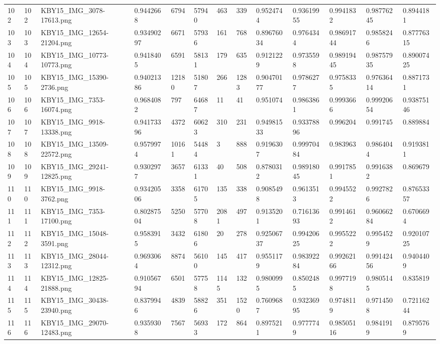 \documentclass[11pt, a4paper, twoside]{report}
\begin{document}
\begin{longtable}[c]{@{}lllllllllllll@{}}
102 & 102 & KBY15\_IMG\_3078-17613.png & 0.9442668 & 6794 & 57940 & 463 & 339 & 0.9524744 & 0.93619955 & 0.9941832 & 0.98776245 & 0.8944181 \\
103 & 103 & KBY15\_IMG\_12654-21204.png & 0.93490297 & 6671 & 57936 & 161 & 768 & 0.89676034 & 0.9764344 & 0.98691744 & 0.9858246 & 0.87776315 \\
104 & 104 & KBY15\_IMG\_10773-10773.png & 0.9418405 & 6591 & 58131 & 179 & 635 & 0.9121229 & 0.9735598 & 0.98919445 & 0.98757935 & 0.89007425 \\
105 & 105 & KBY15\_IMG\_15390-2736.png & 0.94021386 & 12180 & 51807 & 266 & 1283 & 0.90470177 & 0.9786277 & 0.9758335 & 0.97636414 & 0.8871731 \\
106 & 106 & KBY15\_IMG\_7353-16074.png & 0.9684082 & 797 & 64687 & 11 & 41 & 0.951074 & 0.9863861 & 0.9993666 & 0.99920654 & 0.93875146 \\
107 & 107 & KBY15\_IMG\_9918-13338.png & 0.94173396 & 4372 & 60623 & 310 & 231 & 0.94981533 & 0.93378896 & 0.996204 & 0.991745 & 0.889884 \\
108 & 108 & KBY15\_IMG\_13509-22572.png & 0.9579974 & 10161 & 54484 & 3 & 888 & 0.9196307 & 0.99970484 & 0.983963 & 0.9864044 & 0.9193811 \\
109 & 109 & KBY15\_IMG\_29241-12825.png & 0.9302977 & 3657 & 61331 & 40 & 508 & 0.8780312 & 0.98918045 & 0.9917851 & 0.9916382 & 0.869679 \\
110 & 110 & KBY15\_IMG\_9918-3762.png & 0.93420506 & 3358 & 61705 & 135 & 338 & 0.9085498 & 0.9613513 & 0.9945522 & 0.9927826 & 0.87653357 \\
111 & 111 & KBY15\_IMG\_7353-17100.png & 0.80287504 & 5250 & 57708 & 2081 & 497 & 0.9135201 & 0.71613693 & 0.9914612 & 0.96066284 & 0.6706694 \\
112 & 112 & KBY15\_IMG\_15048-3591.png & 0.9583915 & 3432 & 61806 & 20 & 278 & 0.92506737 & 0.99420625 & 0.9955222 & 0.9954529 & 0.92010725 \\
113 & 113 & KBY15\_IMG\_28044-12312.png & 0.9693064 & 8874 & 56100 & 145 & 417 & 0.9551179 & 0.98392284 & 0.99262166 & 0.99142456 & 0.9404409 \\
114 & 114 & KBY15\_IMG\_12825-21888.png & 0.91056794 & 6501 & 57758 & 1145 & 132 & 0.9800995 & 0.8502485 & 0.9977198 & 0.9805145 & 0.835819 \\
115 & 115 & KBY15\_IMG\_30438-23940.png & 0.8379946 & 4839 & 58826 & 351 & 1520 & 0.7609687 & 0.93236995 & 0.9748119 & 0.9714508 & 0.72116244 \\
116 & 116 & KBY15\_IMG\_29070-12483.png & 0.9359308 & 7567 & 56933 & 172 & 864 & 0.8975211 & 0.9777749 & 0.98505116 & 0.9841919 & 0.8795769 \\

\end{longtable}
\end{document}
